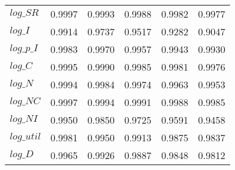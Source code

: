 \begin{center}
\begin{longtable}{lccccc}
$log\_SR    $	 & 	     0.9997	 & 	     0.9993	 & 	     0.9988	 & 	     0.9982	 & 	     0.9977 \\ 
$log\_I     $	 & 	     0.9914	 & 	     0.9737	 & 	     0.9517	 & 	     0.9282	 & 	     0.9047 \\ 
$log\_p\_I  $	 & 	     0.9983	 & 	     0.9970	 & 	     0.9957	 & 	     0.9943	 & 	     0.9930 \\ 
$log\_C     $	 & 	     0.9995	 & 	     0.9990	 & 	     0.9985	 & 	     0.9981	 & 	     0.9976 \\ 
$log\_N     $	 & 	     0.9994	 & 	     0.9984	 & 	     0.9974	 & 	     0.9963	 & 	     0.9953 \\ 
$log\_NC    $	 & 	     0.9997	 & 	     0.9994	 & 	     0.9991	 & 	     0.9988	 & 	     0.9985 \\ 
$log\_NI    $	 & 	     0.9950	 & 	     0.9850	 & 	     0.9725	 & 	     0.9591	 & 	     0.9458 \\ 
$log\_util  $	 & 	     0.9981	 & 	     0.9950	 & 	     0.9913	 & 	     0.9875	 & 	     0.9837 \\ 
$log\_D     $	 & 	     0.9965	 & 	     0.9926	 & 	     0.9887	 & 	     0.9848	 & 	     0.9812 \\ 
\end{longtable}
 \end{center}
